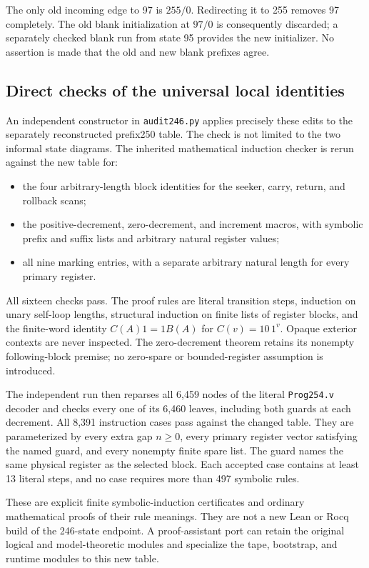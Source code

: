 The only old incoming edge to 97 is $255/0$.  Redirecting it to 255 removes
97 completely.  The old blank initialization at $97/0$ is consequently
discarded; a separately checked blank run from state 95 provides the new
initializer.  No assertion is made that the old and new blank prefixes
agree.

\subsection{Direct checks of the universal local identities}

An independent constructor in \texttt{audit246.py} applies precisely these
edits to the separately reconstructed prefix250 table.  The check is not
limited to the two informal state diagrams.  The inherited mathematical
induction checker is rerun against the new table for:
\begin{itemize}
\item the four arbitrary-length block identities for the seeker, carry,
return, and rollback scans;
\item the positive-decrement, zero-decrement, and increment macros, with
symbolic prefix and suffix lists and arbitrary natural register values;
\item all nine marking entries, with a separate arbitrary natural length
for every primary register.
\end{itemize}
All sixteen checks pass.  The proof rules are literal transition steps,
induction on unary self-loop lengths, structural induction on finite lists
of register blocks, and the finite-word identity $C(A)1=1B(A)$ for
$C(v)=10\,1^v$.  Opaque exterior contexts are never inspected.  The
zero-decrement theorem retains its nonempty following-block premise;
no zero-spare or bounded-register assumption is introduced.

The independent run then reparses all 6,459 nodes of the literal
\texttt{Prog254.v} decoder and checks every one of its 6,460 leaves,
including both guards at each decrement.  All 8,391 instruction cases
pass against the changed table.  They are parameterized by every extra
gap $n\geq0$, every primary register vector satisfying the named guard,
and every nonempty finite spare list.  The guard names the same physical
register as the selected block.  Each accepted case contains at least
13 literal steps, and no case requires more than 497 symbolic rules.

These are explicit finite symbolic-induction certificates and ordinary
mathematical proofs of their rule meanings.  They are not a new Lean or
Rocq build of the 246-state endpoint.  A proof-assistant port can retain
the original logical and model-theoretic modules and specialize the tape,
bootstrap, and runtime modules to this new table.

